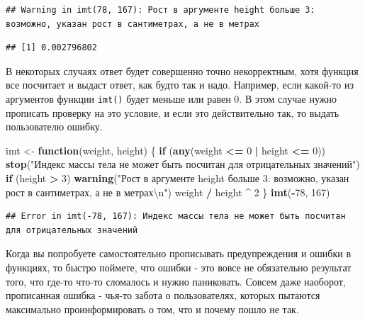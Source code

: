 \documentclass[
]{book}
\newenvironment{Shaded}{\begin{snugshade}}{\end{snugshade}}
\newcommand{\CharTok}[1]{\textcolor[rgb]{0.31,0.60,0.02}{#1}}
\newcommand{\ControlFlowTok}[1]{\textcolor[rgb]{0.13,0.29,0.53}{\textbf{#1}}}
\newcommand{\DecValTok}[1]{\textcolor[rgb]{0.00,0.00,0.81}{#1}}
\newcommand{\KeywordTok}[1]{\textcolor[rgb]{0.13,0.29,0.53}{\textbf{#1}}}
\newcommand{\NormalTok}[1]{#1}
\newcommand{\OperatorTok}[1]{\textcolor[rgb]{0.81,0.36,0.00}{\textbf{#1}}}
\newcommand{\StringTok}[1]{\textcolor[rgb]{0.31,0.60,0.02}{#1}}
\begin{document}
\begin{verbatim}
## Warning in imt(78, 167): Рост в аргументе height больше 3: возможно, указан рост в сантиметрах, а не в метрах
\end{verbatim}

\begin{verbatim}
## [1] 0.002796802
\end{verbatim}

В некоторых случаях ответ будет совершенно точно некорректным, хотя функция все посчитает и выдаст ответ, как будто так и надо. Например, если какой-то из аргументов функции \texttt{imt()} будет меньше или равен 0. В этом случае нужно прописать проверку на это условие, и если это действительно так, то выдать пользователю ошибку.

\begin{Shaded}
\begin{Highlighting}[]
\NormalTok{imt <-}\StringTok{ }\ControlFlowTok{function}\NormalTok{(weight, height) \{}
  \ControlFlowTok{if}\NormalTok{ (}\KeywordTok{any}\NormalTok{(weight }\OperatorTok{<=}\StringTok{ }\DecValTok{0} \OperatorTok{|}\StringTok{ }\NormalTok{height }\OperatorTok{<=}\StringTok{ }\DecValTok{0}\NormalTok{)) }\KeywordTok{stop}\NormalTok{(}\StringTok{"Индекс массы тела не может быть посчитан для отрицательных значений"}\NormalTok{)}
  \ControlFlowTok{if}\NormalTok{ (height }\OperatorTok{>}\StringTok{ }\DecValTok{3}\NormalTok{) }\KeywordTok{warning}\NormalTok{(}\StringTok{"Рост в аргументе height больше 3: возможно, указан рост в сантиметрах, а не в метрах}\CharTok{\textbackslash{}n}\StringTok{"}\NormalTok{)}
\NormalTok{  weight }\OperatorTok{/}\StringTok{ }\NormalTok{height }\OperatorTok{^}\StringTok{ }\DecValTok{2}
\NormalTok{\}}
\KeywordTok{imt}\NormalTok{(}\OperatorTok{-}\DecValTok{78}\NormalTok{, }\DecValTok{167}\NormalTok{)}
\end{Highlighting}
\end{Shaded}

\begin{verbatim}
## Error in imt(-78, 167): Индекс массы тела не может быть посчитан для отрицательных значений
\end{verbatim}

Когда вы попробуете самостоятельно прописывать предупреждения и ошибки в функциях, то быстро поймете, что ошибки - это вовсе не обязательно результат того, что где-то что-то сломалось и нужно паниковать. Совсем даже наоборот, прописанная ошибка - чья-то забота о пользователях, которых пытаются максимально проинформировать о том, что и почему пошло не так.
\end{document}
